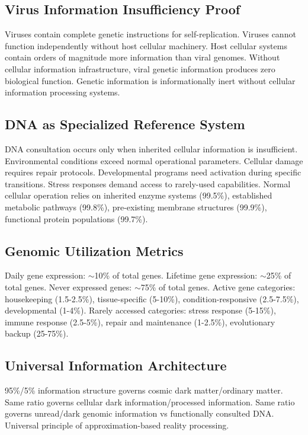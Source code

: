 \documentclass[12pt,a4paper]{article}
\begin{document}
\subsection{Virus Information Insufficiency Proof}

Viruses contain complete genetic instructions for self-replication. Viruses cannot function independently without host cellular machinery. Host cellular systems contain orders of magnitude more information than viral genomes. Without cellular information infrastructure, viral genetic information produces zero biological function. Genetic information is informationally inert without cellular information processing systems.

\subsection{DNA as Specialized Reference System}

DNA consultation occurs only when inherited cellular information is insufficient. Environmental conditions exceed normal operational parameters. Cellular damage requires repair protocols. Developmental programs need activation during specific transitions. Stress responses demand access to rarely-used capabilities. Normal cellular operation relies on inherited enzyme systems (99.5\%), established metabolic pathways (99.8\%), pre-existing membrane structures (99.9\%), functional protein populations (99.7\%).

\subsection{Genomic Utilization Metrics}

Daily gene expression: $\sim$10\% of total genes. Lifetime gene expression: $\sim$25\% of total genes. Never expressed genes: $\sim$75\% of total genes. Active gene categories: housekeeping (1.5-2.5\%), tissue-specific (5-10\%), condition-responsive (2.5-7.5\%), developmental (1-4\%). Rarely accessed categories: stress response (5-15\%), immune response (2.5-5\%), repair and maintenance (1-2.5\%), evolutionary backup (25-75\%).

\subsection{Universal Information Architecture}

95\%/5\% information structure governs cosmic dark matter/ordinary matter. Same ratio governs cellular dark information/processed information. Same ratio governs unread/dark genomic information vs functionally consulted DNA. Universal principle of approximation-based reality processing.
\end{document}
